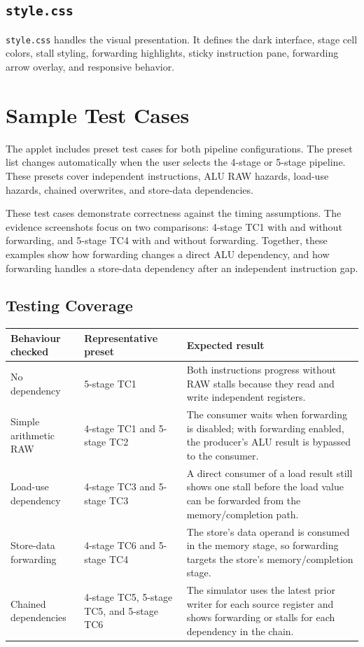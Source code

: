 \documentclass[11pt,a4paper]{article}
\begin{document}
\subsection{\texttt{style.css}}

\texttt{style.css} handles the visual presentation. It defines the dark interface, stage cell colors, stall styling, forwarding highlights, sticky instruction pane, forwarding arrow overlay, and responsive behavior.

\section{Sample Test Cases}

The applet includes preset test cases for both pipeline configurations. The preset list changes automatically when the user selects the 4-stage or 5-stage pipeline. These presets cover independent instructions, ALU RAW hazards, load-use hazards, chained overwrites, and store-data dependencies.

These test cases demonstrate correctness against the timing assumptions. The evidence screenshots focus on two comparisons: 4-stage TC1 with and without forwarding, and 5-stage TC4 with and without forwarding. Together, these examples show how forwarding changes a direct ALU dependency, and how forwarding handles a store-data dependency after an independent instruction gap.

\subsection{Testing Coverage}

\begin{center}
\begin{tabular}{p{}p{}p{}}
\toprule
Behaviour checked & Representative preset & Expected result \\
\midrule
No dependency & 5-stage TC1 & Both instructions progress without RAW stalls because they read and write independent registers. \\
Simple arithmetic RAW & 4-stage TC1 and 5-stage TC2 & The consumer waits when forwarding is disabled; with forwarding enabled, the producer's ALU result is bypassed to the consumer. \\
Load-use dependency & 4-stage TC3 and 5-stage TC3 & A direct consumer of a load result still shows one stall before the load value can be forwarded from the memory/completion path. \\
Store-data forwarding & 4-stage TC6 and 5-stage TC4 & The store's data operand is consumed in the memory stage, so forwarding targets the store's memory/completion stage. \\
Chained dependencies & 4-stage TC5, 5-stage TC5, and 5-stage TC6 & The simulator uses the latest prior writer for each source register and shows forwarding or stalls for each dependency in the chain. \\
\bottomrule
\end{tabular}
\end{center}
\end{document}
